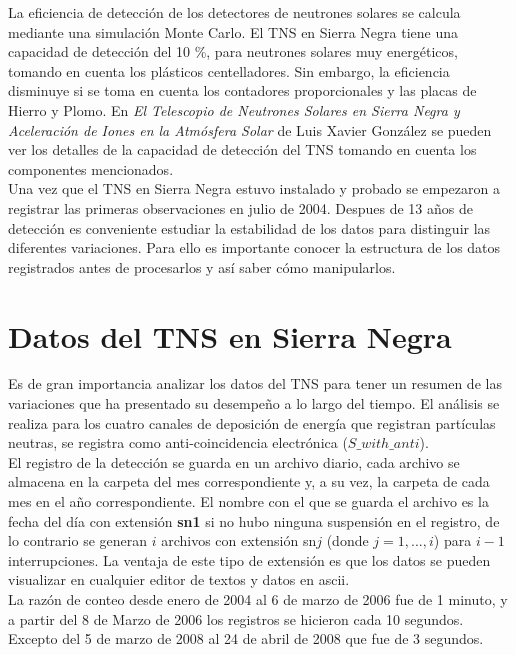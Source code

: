 La eficiencia de detección de los detectores de neutrones solares se calcula mediante una simulación Monte Carlo. El TNS en Sierra Negra tiene una capacidad de detección del 10 \%, para neutrones solares muy energéticos, tomando en cuenta los plásticos centelladores. Sin embargo, la eficiencia disminuye si se toma en cuenta los contadores proporcionales y las placas de Hierro y Plomo. En \textit{El Telescopio de Neutrones Solares en Sierra Negra y Aceleración de Iones en la Atmósfera Solar} de Luis Xavier González\cite{TNS} se pueden ver los detalles de la capacidad de detección del TNS  tomando en cuenta los componentes mencionados.\\

Una vez que el TNS en Sierra Negra estuvo instalado y probado se empezaron a registrar las primeras observaciones en julio de 2004. Despues de 13 años de detección es conveniente estudiar la estabilidad de los datos para distinguir las diferentes variaciones. Para ello es importante conocer la estructura de los datos registrados antes de procesarlos y así saber cómo manipularlos.


\section{Datos del TNS en Sierra Negra}

Es de gran importancia analizar los datos del TNS para tener un resumen de las variaciones que ha presentado su desempeño a lo largo del tiempo. El análisis se realiza para los cuatro canales de deposición de energía que registran partículas neutras, se registra como anti-coincidencia electrónica ($S\_with\_anti$).\\
 
 El registro de la detección se guarda en un archivo diario, cada archivo se almacena en la carpeta del mes correspondiente y, a su vez, la carpeta de cada mes en el año correspondiente. El nombre con el que se guarda el archivo es la fecha del día con extensión \textbf{sn1} si no hubo ninguna suspensión en el registro, de lo contrario se generan $i$ archivos con extensión sn$j$ (donde $j=1,...,i$) para $i-1$ interrupciones. La ventaja de este tipo de extensión es que los datos se pueden visualizar en cualquier editor de textos y datos en ascii.\\

La razón de conteo desde enero de 2004 al 6 de marzo de 2006 fue de 1 minuto, y a partir del 8 de Marzo de 2006 los registros se hicieron cada 10 segundos. Excepto del 5 de marzo de 2008 al 24 de abril de 2008 que fue de 3 segundos.\\
 
